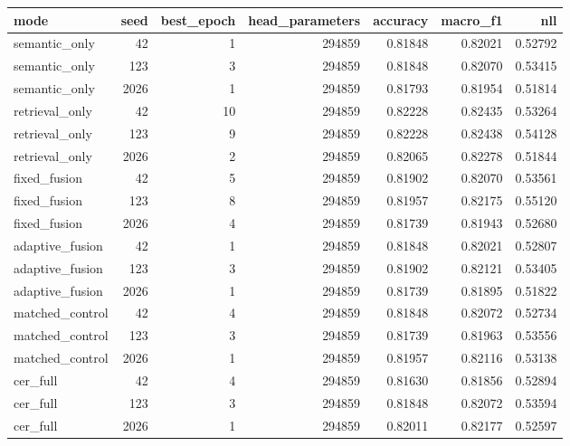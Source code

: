 \begin{tabular}{lrrrrrr}
\toprule
mode & seed & best_epoch & head_parameters & accuracy & macro_f1 & nll \\
\midrule
semantic_only & 42 & 1 & 294859 & 0.81848 & 0.82021 & 0.52792 \\
semantic_only & 123 & 3 & 294859 & 0.81848 & 0.82070 & 0.53415 \\
semantic_only & 2026 & 1 & 294859 & 0.81793 & 0.81954 & 0.51814 \\
retrieval_only & 42 & 10 & 294859 & 0.82228 & 0.82435 & 0.53264 \\
retrieval_only & 123 & 9 & 294859 & 0.82228 & 0.82438 & 0.54128 \\
retrieval_only & 2026 & 2 & 294859 & 0.82065 & 0.82278 & 0.51844 \\
fixed_fusion & 42 & 5 & 294859 & 0.81902 & 0.82070 & 0.53561 \\
fixed_fusion & 123 & 8 & 294859 & 0.81957 & 0.82175 & 0.55120 \\
fixed_fusion & 2026 & 4 & 294859 & 0.81739 & 0.81943 & 0.52680 \\
adaptive_fusion & 42 & 1 & 294859 & 0.81848 & 0.82021 & 0.52807 \\
adaptive_fusion & 123 & 3 & 294859 & 0.81902 & 0.82121 & 0.53405 \\
adaptive_fusion & 2026 & 1 & 294859 & 0.81739 & 0.81895 & 0.51822 \\
matched_control & 42 & 4 & 294859 & 0.81848 & 0.82072 & 0.52734 \\
matched_control & 123 & 3 & 294859 & 0.81739 & 0.81963 & 0.53556 \\
matched_control & 2026 & 1 & 294859 & 0.81957 & 0.82116 & 0.53138 \\
cer_full & 42 & 4 & 294859 & 0.81630 & 0.81856 & 0.52894 \\
cer_full & 123 & 3 & 294859 & 0.81848 & 0.82072 & 0.53594 \\
cer_full & 2026 & 1 & 294859 & 0.82011 & 0.82177 & 0.52597 \\
\bottomrule
\end{tabular}
